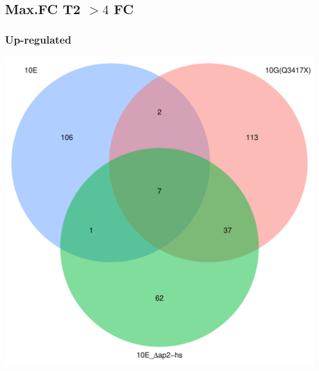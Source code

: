 \documentclass{article}\usepackage[]{graphicx}\usepackage[]{color}
\newenvironment{knitrout}{}{} %
\begin{document}
\subsection{Max.FC T2 $>4$ FC}
\subsubsection{Up-regulated}

\begin{knitrout}
\color{fgcolor}

{\centering \includegraphics[width=1\linewidth,height=.4\textheight]{figure/minimal-venn_t2_3fc_up_venn-1} 

}



\end{knitrout}
\end{document}
